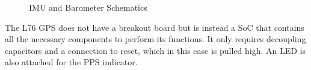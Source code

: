 \documentclass[conf]{new-aiaa}
\begin{document}
\begin{figure}[H]%
    \centering
    \qquad
    \caption{IMU and Barometer Schematics}%
    \label{fig:imuandbaro}%
\end{figure}%

The L76 GPS does not have a breakout board but is instead a SoC that contains all the necessary components to perform its functions\cite{l76}. It only requires decoupling capacitors and a connection to reset, which in this case is pulled high. An LED is also attached for the PPS indicator.
\end{document}
